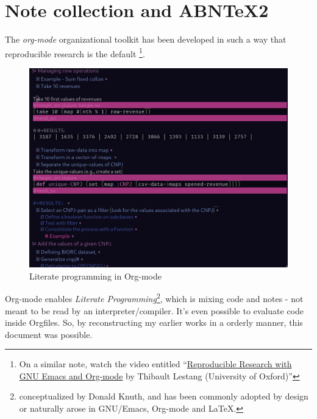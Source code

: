 \documentclass[
12pt,				%
openright,			%
oneside,			%
a4paper,			%
brazil,				%
english,			  %
]{abntex2}
\begin{document}
\section{Note collection and ABNTeX2}

The \textit{org-mode} organizational toolkit has been developed in such a way
that reproducible research is the default
\cite{stanisic2015effective}\footnote{On a similar note, watch the
  video entitled
  ``\href{https://www.youtube.com/watch?v=AP4LX8L7MFM}{Reproducible
    Research with GNU Emacs and Org-mode} by Thibault Lestang (University of Oxford)''}.
\begin{figure}[ht]
  \centering
    \caption{\label{fig:literate-programming} Literate programming in Org-mode}
    \includegraphics[width=0.7\linewidth]{Imagens/org-mode.png}
\end{figure}

Org-mode enables \textit{Literate Programming}\footnote{conceptualized
by Donald Knuth\cite{knuth1984literate}, and has been commonly adopted
by design or naturally arose in GNU/Emacs, Org-mode and \LaTeX{}.}, which is mixing code
and notes - not meant to be read by an interpreter/compiler. It's even
possible to evaluate code inside Orgfiles. So, by reconstructing my
earlier works in a orderly manner, this document was possible.
\end{document}
